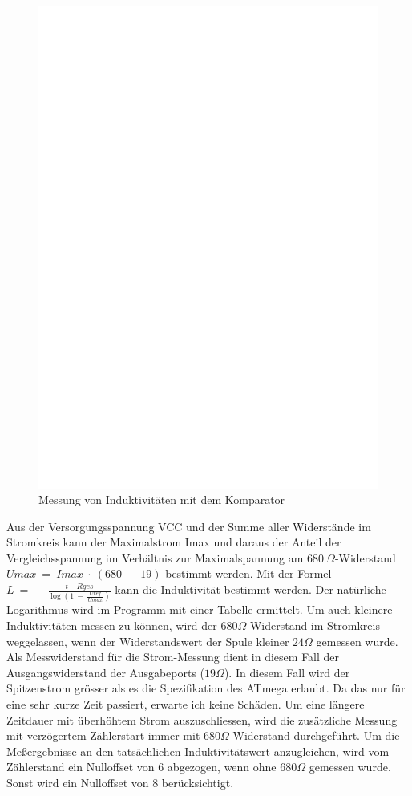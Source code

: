 \begin{figure}[H]
\centering
\includegraphics[]{../FIG/Inductance.eps}
\caption{Messung von Induktivit\"aten mit dem Komparator}
\label{fig:Inductance}
\end{figure}

Aus der Versorgungsspannung VCC und der Summe aller Widerst\"ande im Stromkreis kann der Maximalstrom Imax und
daraus der Anteil der Vergleichsspannung im Verh\"altnis zur Maximalspannung am \(680~\Omega\)-Widerstand
\(Umax~=~Imax~\cdot~(680~+~19)\) bestimmt werden.
Mit der Formel \(L~=~-\frac{t~\cdot~Rges}{\log{(1~-~\frac{Uref}{Umax})}}\) kann die Induktivit\"at bestimmt werden.
Der nat\"urliche Logarithmus wird im Programm mit einer Tabelle ermittelt.
Um auch kleinere Induktivit\"aten messen zu k\"onnen, wird der \(680 \Omega\)-Widerstand im Stromkreis weggelassen,
wenn der Widerstandswert der Spule kleiner \(24 \Omega\) gemessen wurde. Als Messwiderstand f\"ur die Strom-Messung
dient in diesem Fall der Ausgangswiderstand der Ausgabeports (\(19 \Omega\)). In diesem Fall wird der Spitzenstrom gr\"osser
als es die Spezifikation des ATmega erlaubt. Da das nur f\"ur eine sehr kurze Zeit passiert, erwarte ich keine Sch\"aden.
Um eine l\"angere Zeitdauer mit \"uberh\"ohtem Strom auszuschliessen, wird die zus\"atzliche Messung mit 
verz\"ogertem Z\"ahlerstart immer mit \(680 \Omega\)-Widerstand durchgef\"uhrt.
Um die Meßergebnisse an den tats\"achlichen Induktivit\"atswert anzugleichen, wird vom Z\"ahlerstand ein
Nulloffset von 6 abgezogen, wenn ohne \(680 \Omega\) gemessen wurde. Sonst wird ein Nulloffset von 8 ber\"ucksichtigt.


